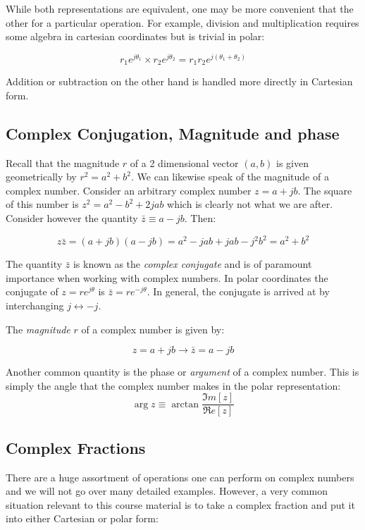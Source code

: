 \documentclass{tufte-book}
\begin{document}
\noindent While both representations are equivalent, one may be more convenient that the other for a particular operation. For example, division and multiplication requires some algebra in cartesian coordinates but is trivial in polar:

$$
r_1e^{j\theta_1}\times r_2e^{j\theta_2} = r_1r_2e^{j\left(\theta_1+\theta_2\right)}
$$

\noindent Addition or subtraction on the other hand is handled more directly in Cartesian form.

\subsection{Complex Conjugation, Magnitude and phase}
Recall that the magnitude $r$ of a 2 dimensional vector $(a,b)$ is given geometrically by $r^2 = a^2 + b^2$. We can likewise speak of the magnitude of a complex number. Consider an arbitrary complex number $z = a + jb$. The square of this number is $z^2 = a^2 - b^2 +2jab$ which is clearly not what we are after. Consider however the quantity $\bar{z} \equiv a-jb$. Then:

$$
 z\bar{z} = \left(a+jb\right)\left(a-jb\right) = a^2 -jab +jab -j^2b^2 = a^2 + b^2
$$

The quantity $\bar{z}$ is known as the \textit{complex conjugate} and is of paramount importance when working with complex numbers. In polar coordinates the conjugate of $z=re^{j\theta}$ is $\bar z = re^{-j\theta}$. In general, the conjugate is arrived at by interchanging $j\leftrightarrow-j$.

\noindent The \textit{magnitude} $r$ of a complex number is given by:

\begin{equation}\label{def:cpx_mag}
z = a+jb \rightarrow\bar{z} = a -jb
\end{equation}

\noindent Another common quantity is the phase or \textit{argument} of a complex number. This is simply the angle that the complex number makes in the polar representation:
\begin{equation}\label{def:cpx_phs}
\arg z \equiv \arctan{\frac{\Im m [z]}{\Re e [z]}}
\end{equation}

\subsection{Complex Fractions}

There are a huge assortment of operations one can perform on complex numbers and we will not go over many detailed examples. However, a very common situation relevant to this course material is to take a complex fraction and put it into either Cartesian or polar form:
\end{document}
